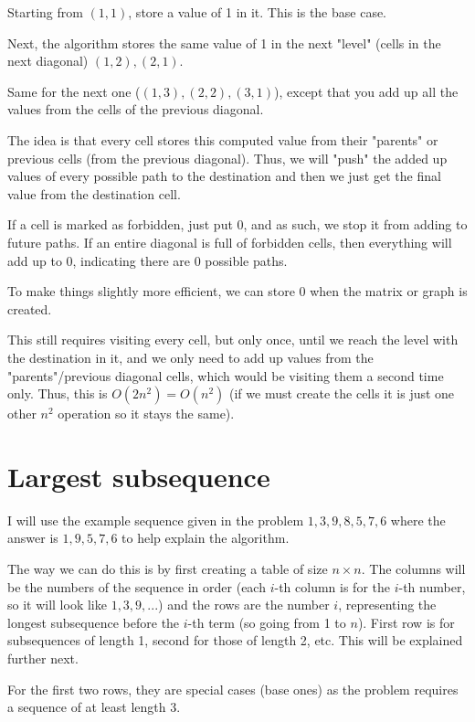 \documentclass[11pt,letterpaper]{article}
\begin{document}
		Starting from $(1,1)$, store a value of 1 in it.
		This is the base case.
		
		Next, the algorithm stores the same value of 1 in the next "level" (cells in the next diagonal) $(1,2), (2,1)$.
		
		Same for the next one ($(1,3), (2,2), (3,1)$), except that you add up all the values from the cells of the previous diagonal.
		
		The idea is that every cell stores this computed value from their "parents" or previous cells (from the previous diagonal).
		Thus, we will "push" the added up values of every possible path to the destination and then we just get the final value from the destination cell.
		
		If a cell is marked as forbidden, just put 0, and as such, we stop it from adding to future paths. If an entire diagonal is full of forbidden cells, then everything will add up to 0, indicating there are 0 possible paths.
		
		To make things slightly more efficient, we can store 0 when the matrix or graph is created.
		
		This still requires visiting every cell, but only once, until we reach the level with the destination in it, and we only need to add up values from the "parents"/previous diagonal cells, which would be visiting them a second time only. Thus, this is $O(2n^2)=O(n^2)$ (if we must create the cells it is just one other $n^2$ operation so it stays the same).
	
	\section{Largest subsequence}
		I will use the example sequence given in the problem $1, 3, 9, 8, 5, 7, 6$ where the answer is $1, 9, 5, 7, 6$ to help explain the algorithm.
		
		The way we can do this is by first creating a table of size $n \times n$.
		The columns will be the numbers of the sequence in order (each $i$-th column is for the $i$-th number, so it will look like $1, 3, 9, ...$) and the rows are the number $i$, representing the longest subsequence before the $i$-th term (so going from 1 to $n$).
		First row is for subsequences of length 1, second for those of length 2, etc.
		This will be explained further next.
		
		For the first two rows, they are special cases (base ones) as the problem requires a sequence of at least length 3.
		
\end{document}
